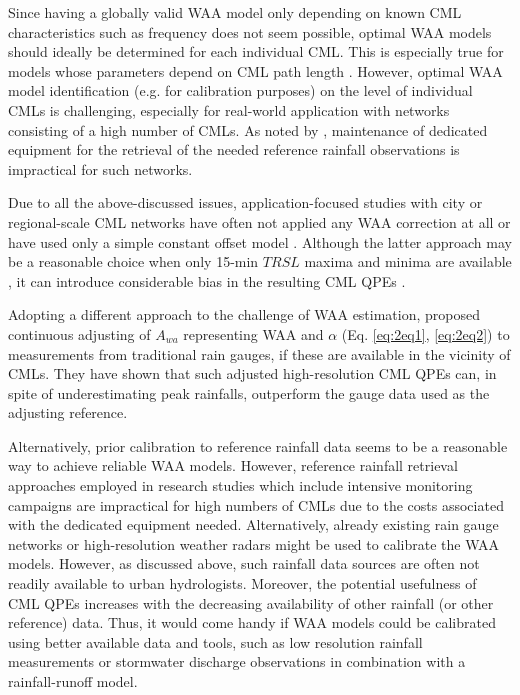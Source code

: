 \documentclass{ctuthesis}\usepackage[]{graphicx}\usepackage[]{color}
\begin{document}
Since having a globally valid WAA model only depending on known CML characteristics such as frequency does not seem possible, optimal WAA models should ideally be determined for each individual CML. This is especially true for models whose parameters depend on CML path length \citep[e.g.][]{kharadlyEffectWetAntenna2001}. However, optimal WAA model identification (e.g. for calibration purposes) on the level of individual CMLs is challenging, especially for real-world application with networks consisting of a high number of CMLs. As noted by \citep{ostrometzkyWetAntennaEffectFactor2018}, maintenance of dedicated equipment for the retrieval of the needed reference rainfall observations is impractical for such networks. 

Due to all the above-discussed issues, application-focused studies with city or regional-scale CML networks have often not applied any WAA correction at all \citep{chwalaPrecipitationObservationUsing2012, smiatekPotentialCommercialMicrowave2017} or have used only a simple constant offset model \citep{overeemMeasuringUrbanRainfall2011, roversiCommercialMicrowaveLinks2020, fenclAtmosphericObservationsEband2020}. Although the latter approach may be a reasonable choice when only 15-min $T\!R\!S\!L$ maxima and minima are available \citep{chwalaCommercialMicrowaveLink2019}, it can introduce considerable bias in the resulting CML QPEs \citep{fenclQuantifyingWetAntenna2019}.

Adopting a different approach to the challenge of WAA estimation, \cite{fenclGaugeadjustedRainfallEstimates2017} proposed continuous adjusting of $A_{wa}$ representing WAA and $\alpha$ (Eq. \ref{eq:2eq1}, \ref{eq:2eq2}) to measurements from traditional rain gauges, if these are available in the vicinity of CMLs. They have shown that such adjusted high-resolution CML QPEs can, in spite of underestimating peak rainfalls, outperform the gauge data used as the adjusting reference.

Alternatively, prior calibration to reference rainfall data seems to be a reasonable way to achieve reliable WAA models. However, reference rainfall retrieval approaches employed in research studies which include intensive monitoring campaigns \citep[e.g.][]{schleissQuantificationModelingWetAntenna2013, lethMeasurementCampaignAssess2018} are impractical for high numbers of CMLs due to the costs associated with the dedicated equipment needed. Alternatively, already existing rain gauge networks or high-resolution weather radars might be used to calibrate the WAA models. However, as discussed above, such rainfall data sources are often not readily available to urban hydrologists. Moreover, the potential usefulness of CML QPEs increases with the decreasing availability of other rainfall (or other reference) data. Thus, it would come handy if WAA models could be calibrated using better available data and tools, such as low resolution rainfall measurements or stormwater discharge observations in combination with a rainfall-runoff model.
\end{document}
